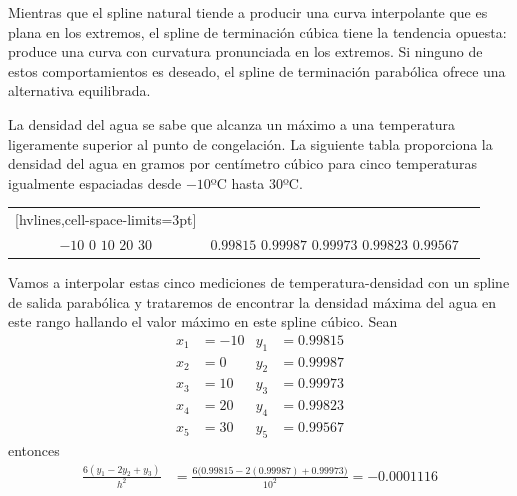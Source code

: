 Mientras que el spline natural tiende a producir una curva interpolante que es plana en los extremos, el spline de terminación cúbica tiene la tendencia opuesta: produce una curva con curvatura pronunciada en los extremos. Si ninguno de estos comportamientos es deseado, el spline de terminación parabólica ofrece una alternativa equilibrada.

\begin{example}
    La densidad del agua se sabe que alcanza un máximo a una temperatura ligeramente superior al punto de congelación. La siguiente tabla proporciona la densidad del agua en gramos por centímetro cúbico para cinco temperaturas igualmente espaciadas desde $-10$º$\mathrm{C}$ hasta $30$º$\mathrm{C}$.
    \begin{table}[h!]
        \centering
        \begin{NiceTabular}{ccc}[hvlines,cell-space-limits=3pt]
             &  \\
             & 
        \end{NiceTabular}
    \end{table}\newpage\noindent
    Vamos a interpolar estas cinco mediciones de temperatura-densidad con un spline de salida parabólica y trataremos de encontrar la densidad máxima del agua en este rango hallando el valor máximo en este spline cúbico. Sean
    \begin{align*}
        x_1 & = -10 & y_1 & = 0.99815 \\
        x_2 & = 0 & y_2 & = 0.99987 \\
        x_3 & = 10 & y_3 & = 0.99973 \\
        x_4 & = 20 & y_4 & = 0.99823 \\
        x_5 & = 30 & y_5 & = 0.99567
    \end{align*}
    entonces
    \begin{align*}
        \frac{6(y_1 - 2y_2 + y_3)}{h^2} & = \frac{6\big(0.99815 - 2(0.99987) + 0.99973\big)}{10^2} = -0.0001116 \\

\end{align*}
\end{example}
